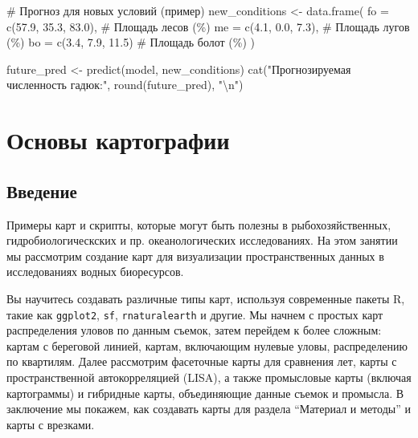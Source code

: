 \documentclass[
  letterpaper,
  DIV=11,
  numbers=noendperiod]{scrreprt}
\newenvironment{Shaded}{\begin{snugshade}}{\end{snugshade}}
\newcommand{\AttributeTok}[1]{\textcolor[rgb]{0.40,0.45,0.13}{#1}}
\newcommand{\CommentTok}[1]{\textcolor[rgb]{0.37,0.37,0.37}{#1}}
\newcommand{\FloatTok}[1]{\textcolor[rgb]{0.68,0.00,0.00}{#1}}
\newcommand{\FunctionTok}[1]{\textcolor[rgb]{0.28,0.35,0.67}{#1}}
\newcommand{\NormalTok}[1]{\textcolor[rgb]{0.00,0.23,0.31}{#1}}
\newcommand{\OtherTok}[1]{\textcolor[rgb]{0.00,0.23,0.31}{#1}}
\newcommand{\SpecialCharTok}[1]{\textcolor[rgb]{0.37,0.37,0.37}{#1}}
\newcommand{\StringTok}[1]{\textcolor[rgb]{0.13,0.47,0.30}{#1}}
\begin{document}
\begin{Shaded}
\begin{Highlighting}[]
\CommentTok{\# Прогноз для новых условий (пример)}
\NormalTok{new\_conditions }\OtherTok{\textless{}{-}} \FunctionTok{data.frame}\NormalTok{(}
  \AttributeTok{fo =} \FunctionTok{c}\NormalTok{(}\FloatTok{57.9}\NormalTok{, }\FloatTok{35.3}\NormalTok{, }\FloatTok{83.0}\NormalTok{),  }\CommentTok{\# Площадь лесов (\%)}
  \AttributeTok{me =} \FunctionTok{c}\NormalTok{(}\FloatTok{4.1}\NormalTok{, }\FloatTok{0.0}\NormalTok{, }\FloatTok{7.3}\NormalTok{),     }\CommentTok{\# Площадь лугов (\%)}
  \AttributeTok{bo =} \FunctionTok{c}\NormalTok{(}\FloatTok{3.4}\NormalTok{, }\FloatTok{7.9}\NormalTok{, }\FloatTok{11.5}\NormalTok{)     }\CommentTok{\# Площадь болот (\%)}
\NormalTok{)}

\NormalTok{future\_pred }\OtherTok{\textless{}{-}} \FunctionTok{predict}\NormalTok{(model, new\_conditions)}
\FunctionTok{cat}\NormalTok{(}\StringTok{"Прогнозируемая численность гадюк:"}\NormalTok{, }\FunctionTok{round}\NormalTok{(future\_pred), }\StringTok{"}\SpecialCharTok{\textbackslash{}n}\StringTok{"}\NormalTok{)}
\end{Highlighting}
\end{Shaded}


\chapter{Основы
картографии}\label{ux43eux441ux43dux43eux432ux44b-ux43aux430ux440ux442ux43eux433ux440ux430ux444ux438ux438}

\section{Введение}\label{ux432ux432ux435ux434ux435ux43dux438ux435-2}

Примеры карт и скрипты, которые могут быть полезны в рыбохозяйственных,
гидробиологическских и пр. океанологических исследованиях. На этом
занятии мы рассмотрим создание карт для визуализации пространственных
данных в исследованиях водных биоресурсов.

Вы научитесь создавать различные типы карт, используя современные пакеты
R, такие как \texttt{ggplot2}, \texttt{sf}, \texttt{rnaturalearth} и
другие. Мы начнем с простых карт распределения уловов по данным съемок,
затем перейдем к более сложным: картам с береговой линией, картам,
включающим нулевые уловы, распределению по квартилям. Далее рассмотрим
фасеточные карты для сравнения лет, карты с пространственной
автокорреляцией (LISA), а также промысловые карты (включая картограммы)
и гибридные карты, объединяющие данные съемок и промысла. В заключение
мы покажем, как создавать карты для раздела ``Материал и методы'' и
карты с врезками.
\end{document}
